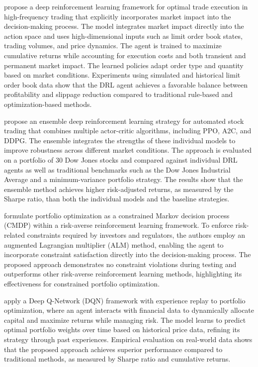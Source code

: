 \documentclass[]{elsarticle}
\begin{document}
\citet{rani2025deep} propose a deep reinforcement learning framework for optimal trade execution in high-frequency trading that explicitly incorporates market impact into the decision-making process. The model integrates market impact directly into the action space and uses high-dimensional inputs such as limit order book states, trading volumes, and price dynamics. The agent is trained to maximize cumulative returns while accounting for execution costs and both transient and permanent market impact. The learned policies adapt order type and quantity based on market conditions. Experiments using simulated and historical limit order book data show that the DRL agent achieves a favorable balance between profitability and slippage reduction compared to traditional rule-based and optimization-based methods.

\citet{yang2020deep} propose an ensemble deep reinforcement learning strategy for automated stock trading that combines multiple actor-critic algorithms, including PPO, A2C, and DDPG. The ensemble integrates the strengths of these individual models to improve robustness across different market conditions. The approach is evaluated on a portfolio of 30 Dow Jones stocks and compared against individual DRL agents as well as traditional benchmarks such as the Dow Jones Industrial Average and a minimum-variance portfolio strategy. The results show that the ensemble method achieves higher risk-adjusted returns, as measured by the Sharpe ratio, than both the individual models and the baseline strategies.

\citet{Ohyun2025} formulate portfolio optimization as a constrained Markov decision process (CMDP) within a risk-averse reinforcement learning framework. To enforce risk-related constraints required by investors and regulators, the authors employ an augmented Lagrangian multiplier (ALM) method, enabling the agent to incorporate constraint satisfaction directly into the decision-making process. The proposed approach demonstrates no constraint violations during testing and outperforms other risk-averse reinforcement learning methods, highlighting its effectiveness for constrained portfolio optimization.

\citet{park2022portfolio} apply a Deep Q-Network (DQN) framework with experience replay to portfolio optimization, where an agent interacts with financial data to dynamically allocate capital and maximize returns while managing risk. The model learns to predict optimal portfolio weights over time based on historical price data, refining its strategy through past experiences. Empirical evaluation on real-world data shows that the proposed approach achieves superior performance compared to traditional methods, as measured by Sharpe ratio and cumulative returns.
\end{document}
